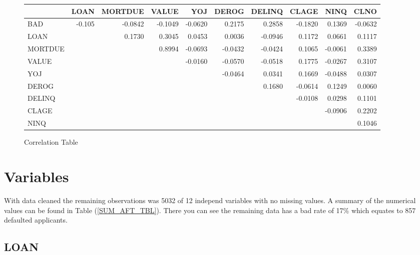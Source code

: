 \begin{landscape}
\begin{figure}[ht]
	\centering
	\renewcommand{\arraystretch}{2}
	\begin{tabular}{lrrrrrrrrr}
		\toprule
		{} &   LOAN &  MORTDUE &   VALUE &     YOJ &   DEROG &  DELINQ &   CLAGE &    NINQ &    CLNO \\
		\midrule
		BAD       & -0.105 &  -0.0842 & -0.1049 & -0.0620 &  0.2175 &  0.2858 & -0.1820 &  0.1369 & -0.0632 \\
		LOAN       &     &   0.1730 &  0.3045 &  0.0453 &  0.0036 & -0.0946 &  0.1172 &  0.0661 &  0.1117 \\
		MORTDUE   &     &       &  0.8994 & -0.0693 & -0.0432 & -0.0424 &  0.1065 & -0.0061 &  0.3389 \\
		VALUE      &     &       &      & -0.0160 & -0.0570 & -0.0518 &  0.1775 & -0.0267 &  0.3107 \\
		YOJ        &     &       &      &      & -0.0464 &  0.0341 &  0.1669 & -0.0488 &  0.0307 \\
		DEROG      &     &       &      &      &      &  0.1680 & -0.0614 &  0.1249 &  0.0060 \\
		DELINQ     &     &       &      &      &      &      & -0.0108 &  0.0298 &  0.1101 \\
		CLAGE      &     &       &      &      &      &      &      & -0.0906 &  0.2202 \\
		NINQ       &     &       &      &      &      &      &      &      &  0.1046 \\
		\bottomrule
	\end{tabular}
	\caption{Correlation Table \label{CORR_TBL}}
\end{figure}
\end{landscape}

\section{Variables}

With data cleaned the remaining observations was 5032 of 12 independ variables with no missing values. A summary of the numerical values can be found in Table (\ref{SUM_AFT_TBL}). There you can see the remaining data has a bad rate of 17\% which equates to 857 defaulted applicants.

\subsection*{LOAN}

